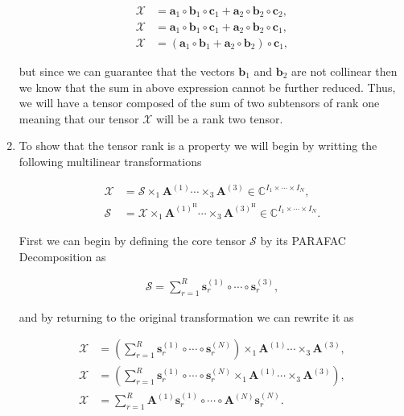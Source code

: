 \documentclass[a4paper,10pt]{article}
\begin{document}
\begin{enumerate}
        \begin{align}
            \mathcal{X} &= \boldsymbol{a}_{1} \circ \boldsymbol{b}_{1} \circ \boldsymbol{c}_{1} + \boldsymbol{a}_{2} \circ \boldsymbol{b}_{2} \circ \boldsymbol{c}_{2}, \\
            \mathcal{X} &= \boldsymbol{a}_{1} \circ \boldsymbol{b}_{1} \circ \boldsymbol{c}_{1} + \boldsymbol{a}_{2} \circ \boldsymbol{b}_{2} \circ \boldsymbol{c}_{1}, \\
            \mathcal{X} &= (\boldsymbol{a}_{1} \circ \boldsymbol{b}_{1} + \boldsymbol{a}_{2} \circ \boldsymbol{b}_{2}) \circ \boldsymbol{c}_{1},
        \end{align}

        but since we can guarantee that the vectors $\boldsymbol{b}_{1}$ and $\boldsymbol{b}_{2}$ are not collinear then we know that the sum in above expression cannot be further reduced. Thus, we will have a tensor 
        composed of the sum of two subtensors of rank one meaning that our tensor $\mathcal{X}$  will be a rank two tensor.

    \item To show that the tensor rank is a property we will begin by writting the following multilinear transformations
    
        \begin{align}
            \mathcal{X} &= \mathcal{S} \times_{1} \boldsymbol{A}^{(1)} \cdots \times_{3} \boldsymbol{A}^{(3)} \in \mathbb{C}^{I_{1} \times \cdots \times I_{N}}, \\
            \mathcal{S} &= \mathcal{X} \times_{1} \boldsymbol{A}^{(1)^{\text{H}}} \cdots \times_{3} \boldsymbol{A}^{(3)^{\text{H}}} \in \mathbb{C}^{I_{1} \times \cdots \times I_{N}}.
        \end{align}

        First we can begin by defining the core tensor $\mathcal{S}$ by its PARAFAC Decomposition as

        \begin{align}
            \mathcal{S} = \sum^{R}_{r = 1} \boldsymbol{s}^{(1)}_{r} \circ \cdots \circ \boldsymbol{s}^{(3)}_{r},
        \end{align}

        and by returning to the original transformation we can rewrite it as 

        \begin{align}
            \mathcal{X} &= \left(\sum^{R}_{r = 1} \boldsymbol{s}^{(1)}_{r} \circ \cdots \circ \boldsymbol{s}^{(N)}_{r}\right) \times_{1} \boldsymbol{A}^{(1)} \cdots \times_{3} \boldsymbol{A}^{(3)}, \\
            \mathcal{X} &= \left(\sum^{R}_{r = 1} \boldsymbol{s}^{(1)}_{r} \circ \cdots \circ \boldsymbol{s}^{(N)}_{r} \times_{1} \boldsymbol{A}^{(1)} \cdots \times_{3} \boldsymbol{A}^{(3)}\right), \\
            \mathcal{X} &= \sum^{R}_{r = 1} \boldsymbol{A}^{(1)} \boldsymbol{s}^{(1)}_{r} \circ \cdots \circ \boldsymbol{A}^{(N)} \boldsymbol{s}^{(N)}_{r}.
        \end{align}


\end{enumerate}
\end{document}
